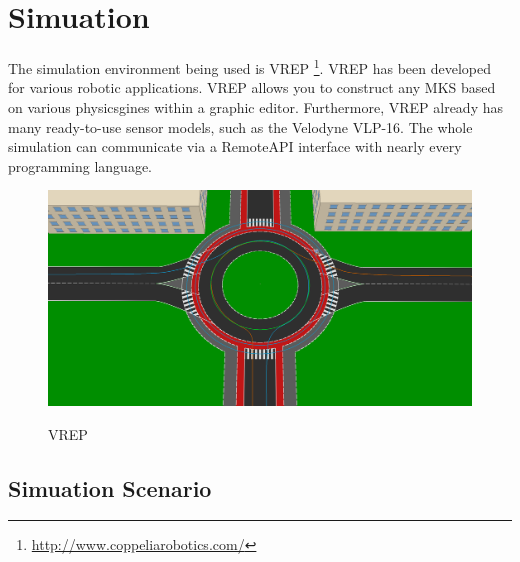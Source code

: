 \documentclass[11pt,oneside,openright]{mpreport}
\begin{document}
\chapter{Simuation}

The simulation environment being used is VREP \footnote{\url{http://www.coppeliarobotics.com/}}. VREP has been developed for various robotic applications.
VREP allows you to construct any \ac{MKS} based on various physicsgines within a graphic editor. Furthermore, VREP already has many ready-to-use sensor models, such as
the Velodyne VLP-16. The whole simulation can communicate via a RemoteAPI interface with nearly every programming language.

\begin{figure}[!ht]
\caption{VREP}
\includegraphics[width=\textwidth]{bilder/path.png}
\label{vrep}
\end{figure}

\section{Simuation Scenario}

\end{document}
